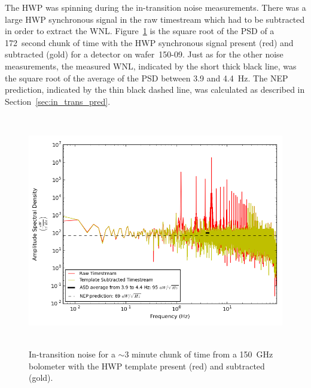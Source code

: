 The \ac{HWP} was spinning during the in-transition noise measurements. 
There was a large \ac{HWP} synchronous signal in the raw timestream which had to be subtracted in order to extract the \ac{WNL}. 
Figure~\ref{fig:in_transition_psd} is the square root of the \ac{PSD} of a 172~second chunk of time with the \ac{HWP} synchronous signal present (red) and subtracted (gold) for a detector on wafer~150-09. 
Just as for the other noise measurements, the measured \ac{WNL}, indicated by the short thick black line, was the square root of the average of the \ac{PSD} between 3.9 and 4.4~Hz. 
The \ac{NEP} prediction, indicated by the thin black dashed line, was calculated as described in Section~\ref{sec:in_trans_pred}. 

\begin{figure}[htp]
\begin{center}
\includegraphics[height=4in]{figures/board68_wire2_ch04_1356979731s_transition.png}
\caption[In-transition spectral density with and without HWP synchronous signal]{In-transition noise for a $\sim$3 minute chunk of time from a 150~GHz bolometer with the \ac{HWP} template present (red) and subtracted (gold). 
\label{fig:in_transition_psd} }
\end{center}
\end{figure}


